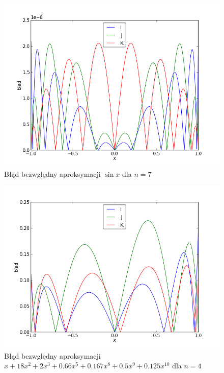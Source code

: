 \documentclass[11pt,leqno]{article}
\begin{document}
\begin{center}
    \begin{figure}[!ht]
        \begin{center}
        \includegraphics{graph1_7.png}
        \caption{Błąd bezwględny aproksymacji $\sin x$ dla $n=7$}\label{G:Wykressin7}
    \end{center}
    \end{figure}
\end{center}
\begin{center}
    \begin{figure}[!ht]
        \begin{center}
        \includegraphics{graph2_4.png}
        \caption{Błąd bezwględny aproksymacji $x + 18x^2 + 2x^3 + 0.66x^5 + 0.167x^8 + 0.5x^9 + 0.125x^{10}$ dla $n=4$}\label{G:Wykrespoly4}
    \end{center}
    \end{figure}
\end{center}
\end{document}
